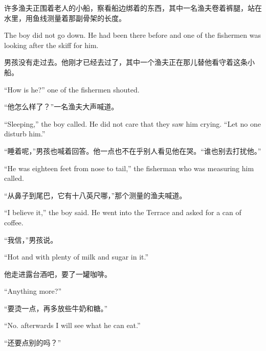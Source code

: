 \begin{paracol}{2}
\switchcolumn

许多渔夫正围着老人的小船，察看船边绑着的东西，其中一名渔夫卷着裤腿，站在水里，用鱼线测量着那副骨架的长度。

\switchcolumn*

The boy did not go down. He had been there before and one of the fishermen
was looking after the skiff for him.

\switchcolumn

男孩没有走过去。他刚才已经去过了，其中一个渔夫正在那儿替他看守着这条小船。

\switchcolumn*

``How is he?'' one of the fishermen shouted.

\switchcolumn

“他怎么样了？”一名渔夫大声喊道。

\switchcolumn*

``Sleeping,'' the boy called. He did not care that they saw him crying.
``Let no one disturb him.''

\switchcolumn

“睡着呢，”男孩也喊着回答。他一点也不在乎别人看见他在哭。“谁也别去打扰他。”

\switchcolumn*

``He was eighteen feet from nose to tail,'' the fisherman who was measuring him called.

\switchcolumn

“从鼻子到尾巴，它有十八英尺哪，”那个测量的渔夫喊道。

\switchcolumn*

``I believe it,'' the boy said. He went into the Terrace and asked for a can of coffee.

\switchcolumn

“我信，”男孩说。

\switchcolumn*

``Hot and with plenty of milk and sugar in it.''

\switchcolumn

他走进露台酒吧，要了一罐咖啡。

\switchcolumn*

``Anything more?''

\switchcolumn

“要烫一点，再多放些牛奶和糖。”

\switchcolumn*

``No. \Gls{afterwards} I will see what he can eat.''

\switchcolumn

“还要点别的吗？”


\end{paracol}

